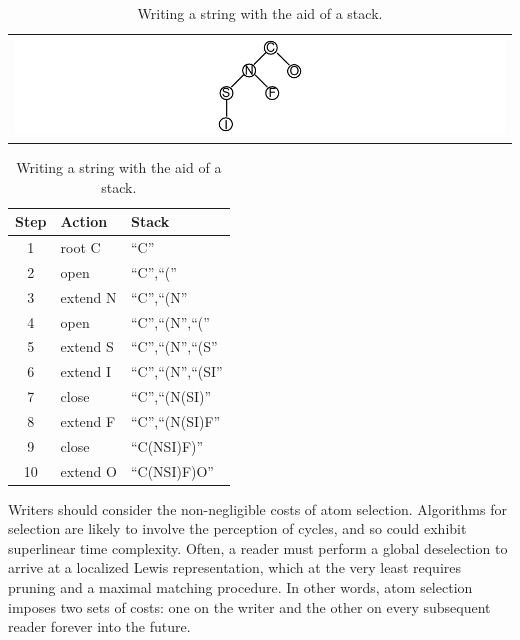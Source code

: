 \documentclass{article}
\begin{document}
\begin{table}
    \caption{Writing a string with the aid of a stack.}
    \centering
    \begin{tabular}{c}
        \includegraphics[width=\columnwidth]{tree-for-stack.pdf}
    \end{tabular}

    \bigskip

    \begin{tabular}{c l l}
        \hline
        Step & Action & Stack \\
        \hline
        1  & root C   & \enquote{C}                             \\
        2  & open     & \enquote{C},\enquote{(}                 \\
        3  & extend N & \enquote{C},\enquote{(N}                \\
        4  & open     & \enquote{C},\enquote{(N},\enquote{(}    \\
        5  & extend S & \enquote{C},\enquote{(N},\enquote{(S}   \\
        6  & extend I & \enquote{C},\enquote{(N},\enquote{(SI}  \\
        7  & close    & \enquote{C},\enquote{(N(SI)}            \\
        8  & extend F & \enquote{C},\enquote{(N(SI)F}           \\
        9  & close    & \enquote{C(NSI)F)}                      \\
        10 & extend O & \enquote{C(NSI)F)O}                     \\
        \hline
    \end{tabular}
    \label{table:stack-for-writing-string}
\end{table}

Writers should consider the non-negligible costs of atom selection. Algorithms for selection are likely to involve the perception of cycles, and so could exhibit superlinear time complexity. Often, a reader must perform a global deselection to arrive at a localized Lewis representation, which at the very least requires pruning and a maximal matching procedure. In other words, atom selection imposes two sets of costs: one on the writer and the other on every subsequent reader forever into the future.
\end{document}
